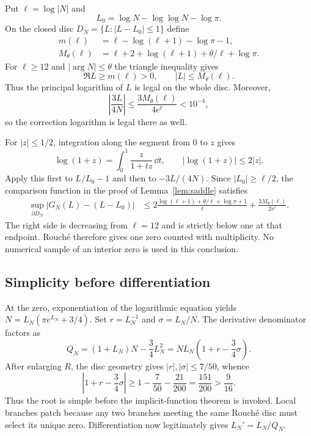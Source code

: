 Put $\ell=\log|N|$ and
\[
 L_0=\log N-\log\log N-\log\pi.
\]
On the closed disc $D_N=\{L:|L-L_0|\le1\}$ define
\begin{align*}
 m(\ell)&=\ell-\log(\ell+1)-\log\pi-1,\\
 M_\theta(\ell)&=\ell+2+\log(\ell+1)+\theta/\ell+\log\pi.
\end{align*}
For $\ell\ge12$ and $|\arg N|\le\theta$ the triangle inequality gives
\begin{equation}\label{app:disc-geometry}
 \Re L\ge m(\ell)>0,\qquad |L|\le M_\theta(\ell).
\end{equation}
Thus the principal logarithm of $L$ is legal on the whole disc.  Moreover,
\begin{equation}\label{app:saddle-small-term}
 \left|\frac{3L}{4N}\right|
 \le\frac{3M_\theta(\ell)}{4e^\ell}<10^{-4},
\end{equation}
so the correction logarithm is legal there as well.

For $|z|\le1/2$, integration along the segment from $0$ to $z$ gives
\[
 \log(1+z)=\int_0^1\frac{z}{1+tz}\,\dd t,
 \qquad |\log(1+z)|\le2|z|.
\]
Apply this first to $L/L_0-1$ and then to $-3L/(4N)$.  Since
$|L_0|\ge\ell/2$, the comparison function in the proof of
Lemma~\ref{lem:saddle} satisfies
\begin{align}
 \sup_{\partial D_N}|G_N(L)-(L-L_0)|
 &\le
 2\frac{\log(\ell+1)+\theta/\ell+\log\pi+1}{\ell}
 +\frac{3M_\theta(\ell)}{2e^\ell}.\label{app:rouche-bound}
\end{align}
The right side is decreasing from $\ell=12$ and is strictly below one at
that endpoint.  Rouch\'e therefore gives one zero counted with multiplicity.
No numerical sample of an interior zero is used in this conclusion.

\subsection{Simplicity before differentiation}

At the zero, exponentiation of the logarithmic equation yields
$N=L_N(\pi e^{L_N}+3/4)$.  Set $r=L_N^{-1}$ and $\sigma=L_N/N$.  The
derivative denominator factors as
\begin{equation}\label{app:Q-factor}
 Q_N=(1+L_N)N-\frac34L_N^2
 =NL_N\left(1+r-\frac34\sigma\right).
\end{equation}
After enlarging $R$, the disc geometry gives $|r|,|\sigma|\le7/50$, whence
\begin{equation}\label{app:Q-margins}
 \left|1+r-\frac34\sigma\right|
 \ge1-\frac7{50}-\frac{21}{200}=\frac{151}{200}>\frac9{16}.
\end{equation}
Thus the root is simple before the implicit-function theorem is invoked.
Local branches patch because any two branches meeting the same Rouch\'e disc
must select its unique zero.  Differentiation now legitimately gives
$L_N'=L_N/Q_N$.

